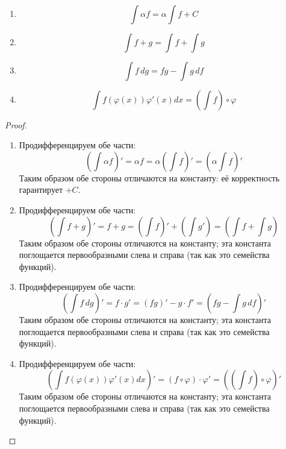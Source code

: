 \documentclass[12pt,a4paper]{article}
\begin{document}
    \begin{theorem}\ 
        \begin{multicols}{2}
            \begin{enumerate}
                \item \[\int \alpha f = \alpha\int f + C\]
                \item \[\int f + g = \int f + \int g\]
                \item \[\int f\, dg = fg - \int g\, df\]
                \item \[\int f(\varphi(x))\varphi'(x)dx = \left(\int f\right) \circ \varphi\]
            \end{enumerate}
        \end{multicols}
    \end{theorem}

    \begin{proof}
        \begin{enumerate}
            \item Продифференцируем обе части:
                \[\left(\int \alpha f\right)' = \alpha f = \alpha \left(\int f\right)' = \left(\alpha \int f\right)'\]
                Таким образом обе стороны отличаются на константу: её корректность гарантирует $+ C$.
            
            \item Продифференцируем обе части:
                \[\left(\int f + g\right)' = f + g = \left(\int f\right)' + \left(\int g'\right) = \left(\int f + \int g\right)\]
                Таким образом обе стороны отличаются на константу; эта константа поглощается первообразными слева и справа (так как это семейства функций).
            
            \item Продифференцируем обе части:
                \[\left(\int f\, dg\right)' = f\cdot g' = (fg)' - g\cdot f' = \left(fg - \int g\, df\right)'\]
                Таким образом обе стороны отличаются на константу; эта константа поглощается первообразными слева и справа (так как это семейства функций).
            
            \item Продифференцируем обе части:
                \[\left(\int f(\varphi(x))\varphi'(x)dx\right)' = (f \circ \varphi) \cdot \varphi' = \left(\left(\int f\right) \circ \varphi\right)'\]
                Таким образом обе стороны отличаются на константу; эта константа поглощается первообразными слева и справа (так как это семейства функций).
        \end{enumerate}
    \end{proof}
\end{document}
